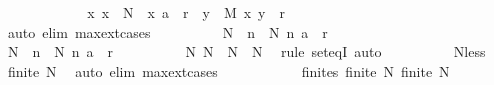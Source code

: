 \begin{isabellebody}
\ \ \ \ \ \ \ \ \isamarkupfalse%
\ \isamarkupfalse%
\ {\isacharasterisk}{\kern0pt}{\isacharcolon}{\kern0pt}\ {\isachardoublequoteopen}{\isasymAnd}x{\isachardot}{\kern0pt}\ x\ {\isasymin}\ N\ {\isasymLongrightarrow}\ {\isacharparenleft}{\kern0pt}x{\isacharcomma}{\kern0pt}\ a{\isacharparenright}{\kern0pt}\ {\isasymin}\ r\ {\isasymor}\ {\isacharparenleft}{\kern0pt}{\isasymexists}y\ {\isasymin}\ M{\isachardot}{\kern0pt}\ {\isacharparenleft}{\kern0pt}x{\isacharcomma}{\kern0pt}\ y{\isacharparenright}{\kern0pt}\ {\isasymin}\ r{\isacharparenright}{\kern0pt}{\isachardoublequoteclose}\isanewline
\ \ \ \ \ \ \ \ \ \ \isamarkupfalse%
\ {\isacharparenleft}{\kern0pt}auto\ elim{\isacharbang}{\kern0pt}{\isacharcolon}{\kern0pt}\ max{\isacharunderscore}{\kern0pt}ext{\isachardot}{\kern0pt}cases{\isacharparenright}{\kern0pt}\isanewline
\isanewline
\ \ \ \ \ \ \ \ \isamarkupfalse%
\ {\isacharquery}{\kern0pt}N{}\ {\isacharequal}{\kern0pt}\ {\isachardoublequoteopen}{\isacharbraceleft}{\kern0pt}n\ {\isasymin}\ N{\isachardot}{\kern0pt}\ {\isacharparenleft}{\kern0pt}n{\isacharcomma}{\kern0pt}\ a{\isacharparenright}{\kern0pt}\ {\isasymin}\ r{\isacharbraceright}{\kern0pt}{\isachardoublequoteclose}\isanewline
\ \ \ \ \ \ \ \ \isamarkupfalse%
\ {\isacharquery}{\kern0pt}N{}\ {\isacharequal}{\kern0pt}\ {\isachardoublequoteopen}{\isacharbraceleft}{\kern0pt}n\ {\isasymin}\ N{\isachardot}{\kern0pt}\ {\isacharparenleft}{\kern0pt}n{\isacharcomma}{\kern0pt}\ a{\isacharparenright}{\kern0pt}\ {\isasymnotin}\ r{\isacharbraceright}{\kern0pt}{\isachardoublequoteclose}\isanewline
\ \ \ \ \ \ \ \ \isamarkupfalse%
\ N{\isacharcolon}{\kern0pt}\ {\isachardoublequoteopen}{\isacharquery}{\kern0pt}N{}\ {\isasymunion}\ {\isacharquery}{\kern0pt}N{}\ {\isacharequal}{\kern0pt}\ N{\isachardoublequoteclose}\ \isamarkupfalse%
\ {\isacharparenleft}{\kern0pt}rule\ set{\isacharunderscore}{\kern0pt}eqI{\isacharparenright}{\kern0pt}\ auto\isanewline
\ \ \ \ \ \ \ \ \isamarkupfalse%
\ Nless\ \isamarkupfalse%
\ {\isachardoublequoteopen}finite\ N{\isachardoublequoteclose}\ \isamarkupfalse%
\ {\isacharparenleft}{\kern0pt}auto\ elim{\isacharcolon}{\kern0pt}\ max{\isacharunderscore}{\kern0pt}ext{\isachardot}{\kern0pt}cases{\isacharparenright}{\kern0pt}\isanewline
\ \ \ \ \ \ \ \ \isamarkupfalse%
\ \isamarkupfalse%
\ finites{\isacharcolon}{\kern0pt}\ {\isachardoublequoteopen}finite\ {\isacharquery}{\kern0pt}N{}{\isachardoublequoteclose}\ {\isachardoublequoteopen}finite\ {\isacharquery}{\kern0pt}N{}{\isachardoublequoteclose}\ \isamarkupfalse%

\end{isabellebody}
